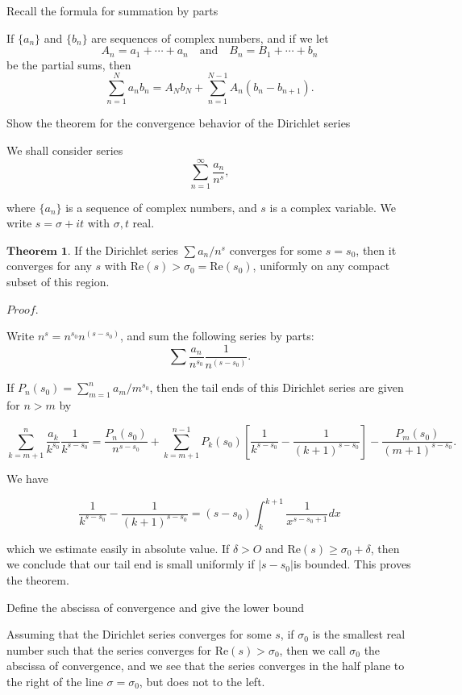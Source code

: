 Recall the formula for summation by parts

If \(\{a_n\}\) and \(\{b_n\}\) are sequences of complex numbers, and if we let
\[
A_n = a_1 + \cdots + a_n \quad \text{and} \quad B_n = B_1 + \cdots + b_n
\]
be the partial sums, then
\[
\sum_{n=1}^N a_n b_n = A_N b_N + \sum_{n=1}^{N-1} A_n (b_n - b_{n+1}).
\]


Show the theorem for the convergence behavior of the Dirichlet series

We shall consider series
\[
\sum_{n=1}^{\infty} \frac{a_n}{n^s},
\]

where \(\{a_n\}\) is a sequence of complex numbers, and \(s\) is a complex variable. 
We write \(s = \sigma + it\) with \(\sigma, t\) real.

\( \textbf{Theorem 1.}  \)
If the Dirichlet series \(\sum a_n / n^s\) converges for some \(s = s_0\),
then it converges for any \(s\) with \(\text{Re}(s) > \sigma_0 = \text{Re}(s_0)\), uniformly on any 
compact subset of this region.

\( \textit{Proof.} \) 

Write \(n^s = n^{s_0} n^{(s-s_0)}\), and sum the following series by parts:
\[
\sum \frac{a_n}{n^{s_0}} \frac{1}{n^{(s-s_0)}}.
\]

If \(P_n(s_0) = \sum_{m=1}^{n} a_m / m^{s_0}\), then the tail ends of this Dirichlet series are 
given for \(n > m\) by

\[
\sum_{k=m+1}^{n} \frac{a_k}{k^{s_0}} \frac{1}{k^{s-s_0}} = \frac{P_n(s_0)}{n^{s-s_0}} + 
\sum_{k=m+1}^{n-1} P_k(s_0) \left[ \frac{1}{k^{s-s_0}} - \frac{1}{(k+1)^{s-s_0}} \right] 
- \frac{P_m(s_0)}{(m+1)^{s-s_0}}.
\]

We have

\[
    \frac{1}{k^{s - s_0}} - \frac{1}{(k+1)^{s-s_0}} = (s - s_0)\int_{k}^{k+1} \frac{1}{x^{s - s_0 + 1}} dx
\]

which we estimate easily in absolute value. If \( \delta > O \) and \( \text{Re}(s) \geq \sigma_0 + \delta \),
then we conclude that our tail end is small uniformly if \( |s - s_0|  \)is bounded.
This proves the theorem.

Define the abscissa of convergence and give the lower bound

Assuming that the Dirichlet series converges for some \( s \), if \( \sigma_0 \) is the
smallest real number such that the series converges for \( \text{Re}(s) > \sigma_0 \), then
we call \( \sigma_0 \) the abscissa of convergence, and we see that the series converges 
in the half plane to the right of the line \( \sigma = \sigma_0 \), but does not to the left.

